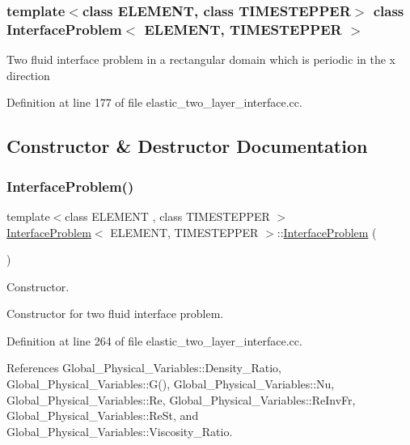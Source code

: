 \subsubsection*{template$<$class E\+L\+E\+M\+E\+NT, class T\+I\+M\+E\+S\+T\+E\+P\+P\+ER$>$\newline
class Interface\+Problem$<$ E\+L\+E\+M\+E\+N\+T, T\+I\+M\+E\+S\+T\+E\+P\+P\+E\+R $>$}

Two fluid interface problem in a rectangular domain which is periodic in the x direction 

Definition at line 177 of file elastic\+\_\+two\+\_\+layer\+\_\+interface.\+cc.



\subsection{Constructor \& Destructor Documentation}
\mbox{\label{classInterfaceProblem_a5889be7fc8eab5d222f1bfb750c845ba}} 
\subsubsection{\texorpdfstring{Interface\+Problem()}{InterfaceProblem()}\hspace{0.1cm}{\footnotesize\ttfamily [1/2]}}
{\footnotesize\ttfamily template$<$class E\+L\+E\+M\+E\+NT , class T\+I\+M\+E\+S\+T\+E\+P\+P\+ER $>$ \\
\hyperlink{classInterfaceProblem}{Interface\+Problem}$<$ E\+L\+E\+M\+E\+NT, T\+I\+M\+E\+S\+T\+E\+P\+P\+ER $>$\+::\hyperlink{classInterfaceProblem}{Interface\+Problem} (\begin{DoxyParamCaption}{ }\end{DoxyParamCaption})}



Constructor. 

Constructor for two fluid interface problem. 

Definition at line 264 of file elastic\+\_\+two\+\_\+layer\+\_\+interface.\+cc.



References Global\+\_\+\+Physical\+\_\+\+Variables\+::\+Density\+\_\+\+Ratio, Global\+\_\+\+Physical\+\_\+\+Variables\+::\+G(), Global\+\_\+\+Physical\+\_\+\+Variables\+::\+Nu, Global\+\_\+\+Physical\+\_\+\+Variables\+::\+Re, Global\+\_\+\+Physical\+\_\+\+Variables\+::\+Re\+Inv\+Fr, Global\+\_\+\+Physical\+\_\+\+Variables\+::\+Re\+St, and Global\+\_\+\+Physical\+\_\+\+Variables\+::\+Viscosity\+\_\+\+Ratio.

